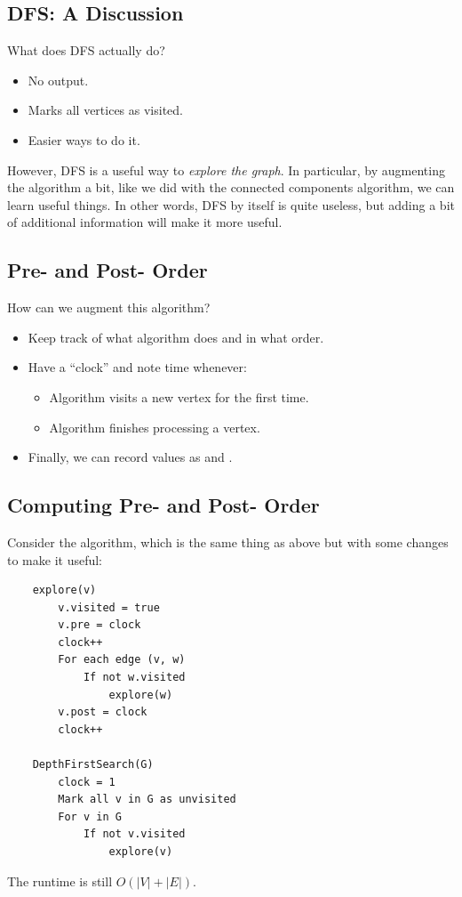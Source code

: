 \documentclass[letterpaper]{article}
\begin{document}
\subsection{DFS: A Discussion}
What does DFS actually do? 
\begin{itemize}
    \item No output.
    \item Marks all vertices as visited. 
    \item Easier ways to do it.
\end{itemize}
However, DFS is a useful way to \emph{explore the graph}. In particular, by augmenting the algorithm a bit, like we did with the connected components algorithm, we can learn useful things. In other words, DFS by itself is quite useless, but adding a bit of additional information will make it more useful. 

\subsection{Pre- and Post- Order}
How can we augment this algorithm?
\begin{itemize}
    \item Keep track of what algorithm does and in what order. 
    \item Have a ``clock'' and note time whenever: 
    \begin{itemize}
        \item Algorithm visits a new vertex for the first time. 
        \item Algorithm finishes processing a vertex.
    \end{itemize}
    \item Finally, we can record values as  and .
\end{itemize}

\subsection{Computing Pre- and Post- Order}
Consider the algorithm, which is the same thing as above but with some changes to make it useful: 
\begin{verbatim}
    explore(v)
        v.visited = true 
        v.pre = clock 
        clock++
        For each edge (v, w)
            If not w.visited
                explore(w)
        v.post = clock 
        clock++

    DepthFirstSearch(G)
        clock = 1
        Mark all v in G as unvisited
        For v in G
            If not v.visited
                explore(v)
\end{verbatim}
The runtime is still $O(|V| + |E|)$. 
\end{document}
